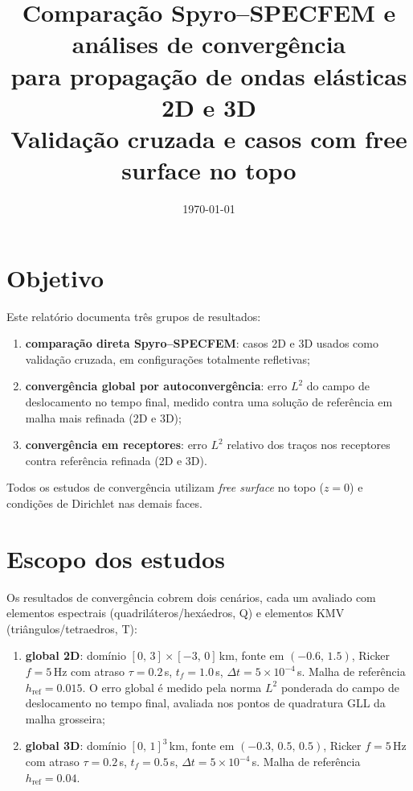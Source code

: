 \documentclass[11pt,a4paper]{article}
\title{Compara\c{c}\~ao Spyro--SPECFEM e an\'alises de converg\^encia\\
para propaga\c{c}\~ao de ondas el\'asticas 2D e 3D\\[6pt]
\large Valida\c{c}\~ao cruzada e casos com free surface no topo}
\author{}
\date{\today}
\begin{document}
\maketitle

\section{Objetivo}

Este relat\'orio documenta tr\^es grupos de resultados:
\begin{enumerate}
    \item \textbf{compara\c{c}\~ao direta Spyro--SPECFEM}: casos 2D e 3D
    usados como valida\c{c}\~ao cruzada, em configura\c{c}\~oes totalmente
    refletivas;
    \item \textbf{converg\^encia global por autoconverg\^encia}: erro $L^2$
    do campo de deslocamento no tempo final, medido contra uma solu\c{c}\~ao
    de refer\^encia em malha mais refinada (2D e 3D);
    \item \textbf{converg\^encia em receptores}: erro $L^2$ relativo dos
    tra\c{c}os nos receptores contra refer\^encia refinada (2D e 3D).
\end{enumerate}

\noindent
Todos os estudos de converg\^encia utilizam \emph{free surface} no topo
($z=0$) e condi\c{c}\~oes de Dirichlet nas demais faces.

\section{Escopo dos estudos}

Os resultados de converg\^encia cobrem dois cen\'arios, cada um avaliado com
elementos espectrais (quadril\'ateros/hex\'aedros, Q) e elementos KMV
(tri\^angulos/tetraedros, T):
\begin{enumerate}
    \item \textbf{global 2D}: dom\'inio $[0,\,3]\times[-3,\,0]$\,km, fonte em
    $(-0.6,\,1.5)$, Ricker $f=5$\,Hz com atraso $\tau=0.2$\,s,
    $t_f=1.0$\,s, $\Delta t=5\times10^{-4}$\,s. Malha de refer\^encia
    $h_{\text{ref}}=0.015$. O erro global \'e medido pela norma $L^2$
    ponderada do campo de deslocamento no tempo final, avaliada nos pontos
    de quadratura GLL da malha grosseira;
    \item \textbf{global 3D}: dom\'inio $[0,\,1]^3$\,km, fonte em
    $(-0.3,\,0.5,\,0.5)$, Ricker $f=5$\,Hz com atraso $\tau=0.2$\,s,
    $t_f=0.5$\,s, $\Delta t=5\times10^{-4}$\,s. Malha de refer\^encia
    $h_{\text{ref}}=0.04$.
\end{enumerate}
\end{document}

